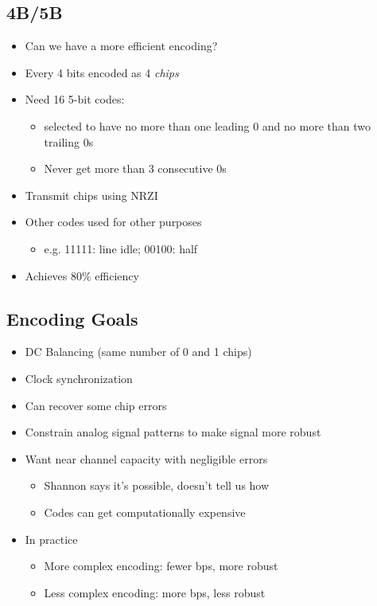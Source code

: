\subsection{4B/5B}
\begin{itemize}[nosep]
    \item Can we have a more efficient encoding?
    \item Every 4 bits encoded as 4 \emph{chips}
    \item Need 16 5-bit codes:
          \begin{itemize}[nosep]
              \item selected to have no more than one leading 0 and no more than two trailing 0s
              \item Never get more than 3 consecutive 0s
          \end{itemize}
    \item Transmit chips using NRZI
    \item Other codes used for other purposes
          \begin{itemize}[nosep]
              \item e.g. 11111: line idle; 00100: half
          \end{itemize}
    \item Achieves 80\% efficiency
\end{itemize}

\subsection{Encoding Goals}
\begin{itemize}[nosep]
    \item DC Balancing (same number of 0 and 1 chips)
    \item Clock synchronization
    \item Can recover some chip errors
    \item Constrain analog signal patterns to make signal more robust
    \item Want near channel capacity with negligible errors
          \begin{itemize}[nosep]
              \item Shannon says it's possible, doesn't tell us how
              \item Codes can get computationally expensive
          \end{itemize}
    \item In practice
          \begin{itemize}[nosep]
              \item More complex encoding: fewer bps, more robust
              \item Less complex encoding: more bps, less robust
          \end{itemize}
\end{itemize}

